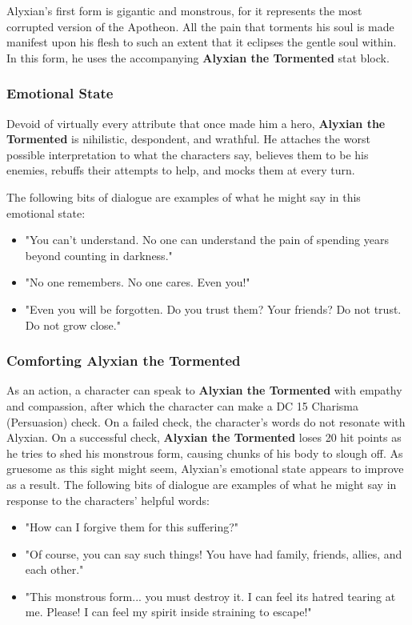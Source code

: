 \documentclass[a4paper, 11pt, bg=full, twocolumn, nooutline]{dndbook}
\begin{document}
Alyxian's first form is gigantic and monstrous, for it represents the most corrupted version of the Apotheon. All the pain that torments his soul is made manifest upon his flesh to such an extent that it eclipses the gentle soul within. In this form, he uses the accompanying \textbf{Alyxian the Tormented} stat block.


\subsubsection{Emotional State}

Devoid of virtually every attribute that once made him a hero, \textbf{Alyxian the Tormented} is nihilistic, despondent, and wrathful. He attaches the worst possible interpretation to what the characters say, believes them to be his enemies, rebuffs their attempts to help, and mocks them at every turn.

The following bits of dialogue are examples of what he might say in this emotional state:

\begin{itemize}
\item "You can't understand. No one can understand the pain of spending years beyond counting in darkness."
\item "No one remembers. No one cares. Even you!"
\item "Even you will be forgotten. Do you trust them? Your friends? Do not trust. Do not grow close."
\end{itemize}

\subsubsection{Comforting Alyxian the Tormented}

As an action, a character can speak to \textbf{Alyxian the Tormented} with empathy and compassion, after which the character can make a DC 15 Charisma (Persuasion) check. On a failed check, the character's words do not resonate with Alyxian. On a successful check, \textbf{Alyxian the Tormented} loses 20 hit points as he tries to shed his monstrous form, causing chunks of his body to slough off. As gruesome as this sight might seem, Alyxian's emotional state appears to improve as a result. The following bits of dialogue are examples of what he might say in response to the characters' helpful words:

\begin{itemize}
\item "How can I forgive them for this suffering?"
\item "Of course, you can say such things! You have had family, friends, allies, and each other."
\item "This monstrous form... you must destroy it. I can feel its hatred tearing at me. Please! I can feel my spirit inside straining to escape!"
\end{itemize}
\end{document}
